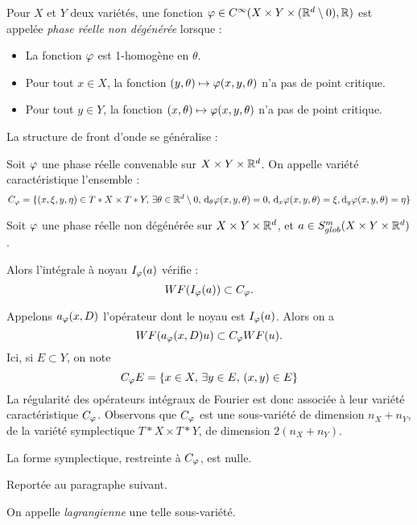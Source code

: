 \begin{defn}
  Pour $X$ et $Y$ deux variétés, une fonction $\varphi \in C^{\infty}(X \times Y \times (\mathbb{R}^d\setminus 0),\mathbb{R})$ est appelée \emph{phase réelle non dégénérée} lorsque :
  \begin{itemize}
    \item La fonction $\varphi$ est 1-homogène en $\theta$.
    \item Pour tout $x\in X$, la fonction $(y,\theta)\mapsto \varphi(x,y,\theta)$ n'a pas de point critique.
    \item Pour tout $y\in Y$, la fonction $(x,\theta)\mapsto \varphi(x,y,\theta)$ n'a pas de point critique.
  \end{itemize}
\end{defn}

La structure de front d'onde se généralise :

\begin{defn}Soit $\varphi$ une phase réelle convenable sur $X\times Y\times \mathbb{R}^d$. On appelle variété caractéristique l'ensemble :
\begin{equation}
    C_{\varphi}=\{(x,\xi,y,\eta) \in T*X \times T*Y,\,\exists \theta\in \mathbb{R}^d\setminus 0,\,\mathrm{d}_{\theta}\varphi(x,y,\theta)=0,\,\mathrm{d}_x\varphi(x,y,\theta)=\xi, \mathrm{d}_y\varphi(x,y,\theta)=\eta\}
\end{equation}  
\end{defn}

\begin{prop}
  Soit $\varphi$ une phase réelle non dégénérée sur $X\times Y\times \mathbb{R}^d$, et $a \in S^m_{glob}(X\times Y\times \mathbb{R}^d)$. 

  Alors l'intégrale à noyau $I_{\varphi}(a)$ vérifie :
  \begin{equation*}
    WF(I_{\varphi}(a)) \subset C_{\varphi}.
  \end{equation*}
\end{prop}
Appelons $a_{\varphi}(x,D)$ l'opérateur dont le noyau est $I_{\varphi}(a)$. Alors on a 
  \begin{equation*}
    WF(a_{\varphi}(x,D)u) \subset C_{\varphi}WF(u).
  \end{equation*}
Ici, si $E \subset Y$, on note
\begin{equation*}
  C_{\varphi}E=\{x \in X,\,\exists y \in E,\,(x,y)\in E\}
\end{equation*}
La régularité des opérateurs intégraux de Fourier est donc associée à leur variété caractéristique $C_{\varphi}$. Observons que $C_{\varphi}$ est une sous-variété de dimension $n_X+n_Y$, de la variété symplectique $T*X\times T*Y$, de dimension $2(n_X+n_Y)$. 
\begin{lem}
La forme symplectique, restreinte à $C_{\varphi}$, est nulle.
\end{lem}
\begin{preuve}
Reportée au paragraphe suivant.
\end{preuve}
On appelle \emph{lagrangienne} une telle sous-variété.
